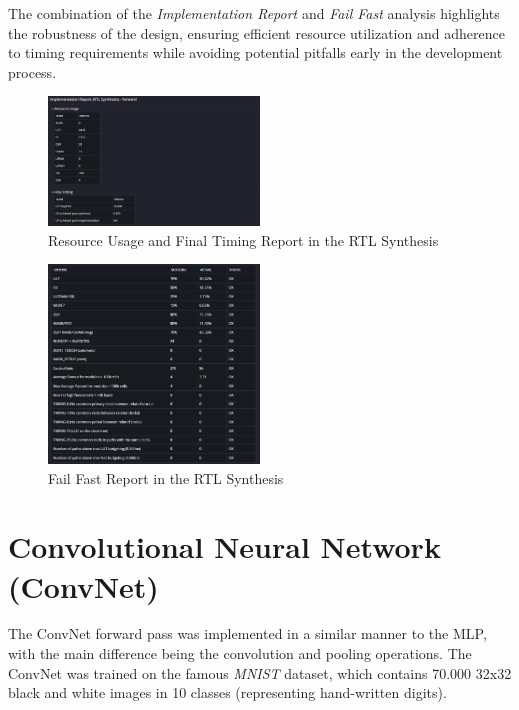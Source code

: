 \documentclass{article}
\begin{document}
The combination of the \textit{Implementation Report} and \textit{Fail Fast} analysis highlights the robustness of the design, ensuring efficient resource utilization and adherence to timing requirements while avoiding potential pitfalls early in the development process.




\begin{figure}[H]
    \centering
    \includegraphics[width=0.5\textwidth]{./assets/MLP/implementation-resourceusagefinaltiming.png}
    \caption{Resource Usage and Final Timing Report in the RTL Synthesis}
    \label{fig:rtl-synthesis}
\end{figure}




\begin{figure}[H]
    \centering
    \includegraphics[width=0.5\textwidth]{./assets/MLP/implementation-failfast.png}
    \caption{Fail Fast Report in the RTL Synthesis}
    \label{fig:fail-fast}
\end{figure}



\section{Convolutional Neural Network (ConvNet)}
The ConvNet forward pass was implemented in a similar manner to the MLP, with the main difference being the convolution and pooling operations. The ConvNet was trained on the famous \textit{MNIST} dataset, which contains 70.000 32x32 black and white images in 10 classes (representing hand-written digits).
\end{document}
